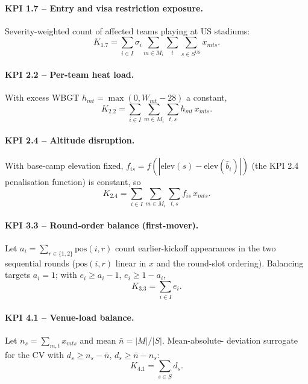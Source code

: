 \documentclass[12pt, letterpaper]{article}
\newcommand{\elev}{\mathrm{elev}}
\begin{document}
\paragraph{KPI 1.7 -- Entry and visa restriction exposure.}
Severity-weighted count of affected teams playing at US stadiums:
\begin{equation}
  K_{1.7}=\sum_{i\in I}\sigma_i
          \sum_{m\in M_i}\sum_{t}\sum_{s\in S^{\mathrm{US}}} x_{mts}.
\end{equation}

\paragraph{KPI 2.2 -- Per-team heat load.}
With excess WBGT $h_{mt}=\max(0,W_{mt}-28)$ a constant,
\begin{equation}
  K_{2.2}=\sum_{i\in I}\sum_{m\in M_i}\sum_{t,s} h_{mt}\,x_{mts}.
\end{equation}

\paragraph{KPI 2.4 -- Altitude disruption.}
With base-camp elevation fixed, $f_{is}=f(|\elev(s)-\elev(\hat b_i)|)$
(the KPI 2.4 penalisation function) is constant, so
\begin{equation}
  K_{2.4}=\sum_{i\in I}\sum_{m\in M_i}\sum_{t,s} f_{is}\,x_{mts}.
\end{equation}

\paragraph{KPI 3.3 -- Round-order balance (first-mover).}
Let $a_i=\sum_{r\in\{1,2\}}\mathrm{pos}(i,r)$ count earlier-kickoff
appearances in the two sequential rounds ($\mathrm{pos}(i,r)$ linear in
$x$ and the round-slot ordering). Balancing targets $a_i=1$; with
$e_i\ge a_i-1$, $e_i\ge 1-a_i$,
\begin{equation}
  K_{3.3}=\sum_{i\in I} e_i .
\end{equation}

\paragraph{KPI 4.1 -- Venue-load balance.}
Let $n_s=\sum_{m,t} x_{mts}$ and mean $\bar n=|M|/|S|$. Mean-absolute-
deviation surrogate for the CV with $d_s\ge n_s-\bar n$,
$d_s\ge \bar n-n_s$:
\begin{equation}
  K_{4.1}=\sum_{s\in S} d_s .
\end{equation}
\end{document}
